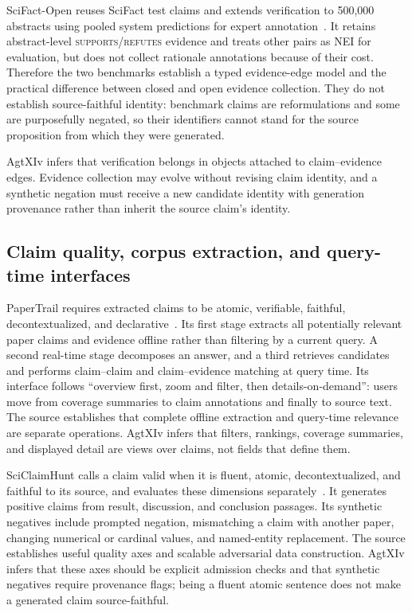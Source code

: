 SciFact-Open reuses SciFact test claims and extends verification to 500,000 abstracts using pooled system predictions for expert annotation~\cite{wadden2022scifactopen}. It retains abstract-level \textsc{supports}/\textsc{refutes} evidence and treats other pairs as NEI for evaluation, but does not collect rationale annotations because of their cost. Therefore the two benchmarks establish a typed evidence-edge model and the practical difference between closed and open evidence collection. They do not establish source-faithful identity: benchmark claims are reformulations and some are purposefully negated, so their identifiers cannot stand for the source proposition from which they were generated.

AgtXIv infers that verification belongs in \ClaimAssessment{} objects attached to claim--evidence edges. Evidence collection may evolve without revising claim identity, and a synthetic negation must receive a new candidate identity with generation provenance rather than inherit the source claim's identity.

\subsection{Claim quality, corpus extraction, and query-time interfaces}

PaperTrail requires extracted claims to be atomic, verifiable, faithful, decontextualized, and declarative~\cite{martinboyle2026papertrail}. Its first stage extracts all potentially relevant paper claims and evidence offline rather than filtering by a current query. A second real-time stage decomposes an answer, and a third retrieves candidates and performs claim--claim and claim--evidence matching at query time. Its interface follows ``overview first, zoom and filter, then details-on-demand'': users move from coverage summaries to claim annotations and finally to source text. The source establishes that complete offline extraction and query-time relevance are separate operations. AgtXIv infers that filters, rankings, coverage summaries, and displayed detail are views over claims, not fields that define them.

SciClaimHunt calls a claim valid when it is fluent, atomic, decontextualized, and faithful to its source, and evaluates these dimensions separately~\cite{kumar2025sciclaimhunt}. It generates positive claims from result, discussion, and conclusion passages. Its synthetic negatives include prompted negation, mismatching a claim with another paper, changing numerical or cardinal values, and named-entity replacement. The source establishes useful quality axes and scalable adversarial data construction. AgtXIv infers that these axes should be explicit admission checks and that synthetic negatives require provenance flags; being a fluent atomic sentence does not make a generated claim source-faithful.

